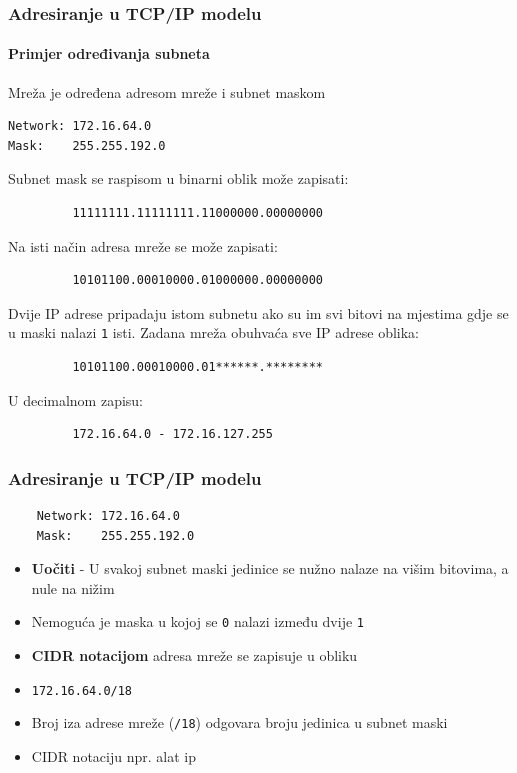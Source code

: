 \documentclass[t,table,usenames,dvipsnames]{beamer}
\begin{document}
\begin{frame}[fragile]
	\frametitle{Adresiranje u TCP/IP modelu}
	\framesubtitle{Primjer određivanja subneta}
	\footnotesize
	Mreža je određena adresom mreže i subnet maskom
	\begin{verbatim}
Network: 172.16.64.0
Mask:    255.255.192.0
	\end{verbatim}
	Subnet mask se raspisom u binarni oblik može zapisati:
	\begin{verbatim}
         11111111.11111111.11000000.00000000
	\end{verbatim}
	Na isti način adresa mreže se može zapisati:
	\begin{verbatim}
         10101100.00010000.01000000.00000000
	\end{verbatim}
	Dvije IP adrese pripadaju istom subnetu ako su im svi bitovi na mjestima gdje se u maski nalazi \texttt{1} isti. Zadana mreža obuhvaća sve IP adrese oblika:
	\begin{verbatim}
         10101100.00010000.01******.********
	\end{verbatim}
	U decimalnom zapisu:
	\begin{verbatim}
         172.16.64.0 - 172.16.127.255
	\end{verbatim}
\end{frame}

\begin{frame}[fragile]
	\frametitle{Adresiranje u TCP/IP modelu}
	\begin{verbatim}
	Network: 172.16.64.0
	Mask:    255.255.192.0
	\end{verbatim}
	\begin{itemize}
		\item \textbf{Uočiti} - U svakoj subnet maski jedinice se nužno nalaze na višim bitovima, a nule na nižim
		\item Nemoguća je maska u kojoj se \texttt{0} nalazi između dvije \texttt{1}
	\end{itemize}
	\begin{itemize}
		\item \textbf{CIDR notacijom} adresa mreže se zapisuje u obliku
		\item[] \texttt{172.16.64.0/18}
		\item Broj iza adrese mreže (\texttt{/18}) odgovara broju jedinica u subnet maski
        \item CIDR notaciju npr. alat ip
	\end{itemize}
\end{frame}
\end{document}
